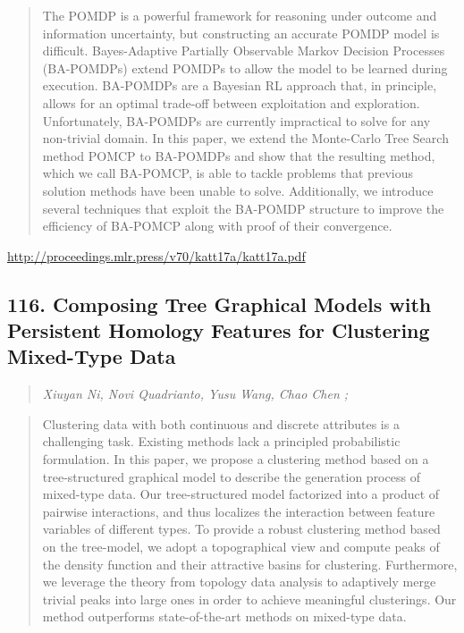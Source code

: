 \documentclass{article}
\begin{document}
\begin{quote}
    The POMDP is a powerful framework for reasoning under outcome and information uncertainty, but constructing an accurate POMDP model is difficult. Bayes-Adaptive Partially Observable Markov Decision Processes (BA-POMDPs) extend POMDPs to allow the model to be learned during execution. BA-POMDPs are a Bayesian RL approach that, in principle, allows for an optimal trade-off between exploitation and exploration. Unfortunately, BA-POMDPs are currently impractical to solve for any non-trivial domain. In this paper, we extend the Monte-Carlo Tree Search method POMCP to BA-POMDPs and show that the resulting method, which we call BA-POMCP, is able to tackle problems that previous solution methods have been unable to solve. Additionally, we introduce several techniques that exploit the BA-POMDP structure to improve the efficiency of BA-POMCP along with proof of their convergence.  \end{quote}

\href{http://proceedings.mlr.press/v70/katt17a/katt17a.pdf}{http://proceedings.mlr.press/v70/katt17a/katt17a.pdf}

\subsection{116. Composing Tree Graphical Models with Persistent Homology Features for Clustering Mixed-Type Data}

\begin{quote}
\footnotesize{\textit{Xiuyan Ni, Novi Quadrianto, Yusu Wang, Chao Chen ;}}
\end{quote}

\begin{quote}
    Clustering data with both continuous and discrete attributes is a challenging task. Existing methods lack a principled probabilistic formulation. In this paper, we propose a clustering method based on a tree-structured graphical model to describe the generation process of mixed-type data. Our tree-structured model factorized into a product of pairwise interactions, and thus localizes the interaction between feature variables of different types. To provide a robust clustering method based on the tree-model, we adopt a topographical view and compute peaks of the density function and their attractive basins for clustering. Furthermore, we leverage the theory from topology data analysis to adaptively merge trivial peaks into large ones in order to achieve meaningful clusterings. Our method outperforms state-of-the-art methods on mixed-type data.  \end{quote}
\end{document}
